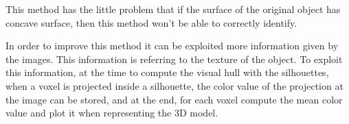 \documentclass{ethz_report}
\begin{document}
This method has the little problem that if the surface of the original object has concave surface, then this method won't be able to correctly identify.

In order to improve this method it can be exploited more information given by the images. This information is referring to the texture of the object. To exploit this information, at the time to compute the visual hull with the silhouettes, when a voxel is projected inside a silhouette, the color value of the projection at the image can be stored, and at the end, for each voxel compute the mean color value and plot it when representing the 3D model.
\end{document}
